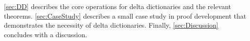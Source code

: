 %
\autoref{sec:DD} describes the core operations for delta dictionaries and the relevant theorems.
%
\autoref{sec:CaseStudy} describes a small case study in proof development that demonstrates the necessity of delta dictionaries.
%
Finally, \autoref{sec:Discussion} concludes with a discussion.
%
